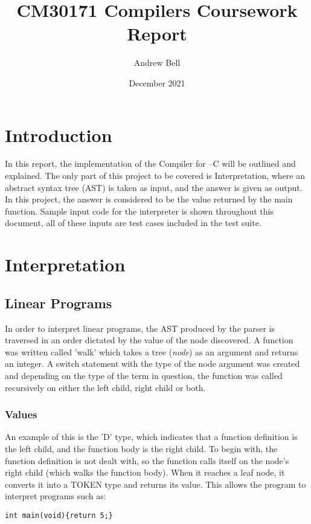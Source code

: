 \documentclass[11pt]{article}
\author{Andrew Bell}
\title{CM30171 Compilers Coursework Report}
\date{December 2021}
\begin{document}
\maketitle
\tableofcontents

\section{Introduction}

In this report, the implementation of the Compiler for --C will be outlined and explained. The only part of this project to be covered is Interpretation, where an abstract syntax tree (AST) is taken as input, and the answer is given as output. In this project, the answer is considered to be the value returned by the main function. Sample input code for the interpreter is shown throughout this document, all of these inputs are test cases included in the test suite.

\section{Interpretation}

\subsection{Linear Programs}

In order to interpret linear programs, the AST produced by the parser is traversed in an order dictated by the value of the node discovered. A function was written called 'walk' which takes a tree (\emph{node}) as an argument and returns an integer. A switch statement with the type of the node argument was created and depending on the type of the term in question, the function was called recursively on either the left child, right child or both. 

\subsubsection{Values}

An example of this is the 'D' type, which indicates that a function definition is the left child, and the function body is the right child. To begin with, the function definition is not dealt with, so the function calls itself on the node's right child (which walks the function body). When it reaches a leaf node, it converts it into a TOKEN type and returns its value. This allows the program to interpret programs such as:
\begin{lstlisting}
int main(void){return 5;}
\end{lstlisting}
\end{document}

